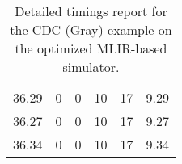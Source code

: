 \begin{table}[h]
{\begin{tabular}{cccccc}
            36.29              & 0                          & 0                          & 10                         & 17                         & 9.29                   \\
            36.27              & 0                          & 0                          & 10                         & 17                         & 9.27                   \\
            36.34              & 0                          & 0                          & 10                         & 17                         & 9.34                   \\
            \bottomrule
        \end{tabular}
    }
    \caption{Detailed timings report for the CDC (Gray) example on the optimized MLIR-based simulator.}
\end{table}

